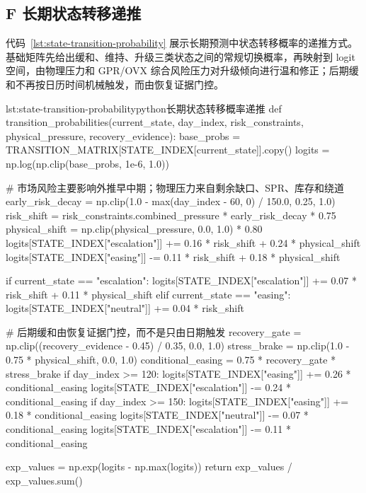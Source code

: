 \subsection*{F 长期状态转移递推}

代码~\ref{lst:state-transition-probability} 展示长期预测中状态转移概率的递推方式。基础矩阵先给出缓和、维持、升级三类状态之间的常规切换概率，再映射到 logit 空间，由物理压力和 GPR/OVX 综合风险压力对升级倾向进行温和修正；后期缓和不再按日历时间机械触发，而由恢复证据门控。

\begin{paperlisting}{lst:state-transition-probability}{python}{长期状态转移概率递推}
def transition_probabilities(current_state, day_index, risk_constraints,
                             physical_pressure, recovery_evidence):
    base_probs = TRANSITION_MATRIX[STATE_INDEX[current_state]].copy()
    logits = np.log(np.clip(base_probs, 1e-6, 1.0))

    # 市场风险主要影响外推早中期；物理压力来自剩余缺口、SPR、库存和绕道
    early_risk_decay = np.clip(1.0 - max(day_index - 60, 0) / 150.0,
                               0.25, 1.0)
    risk_shift = risk_constraints.combined_pressure * early_risk_decay * 0.75
    physical_shift = np.clip(physical_pressure, 0.0, 1.0) * 0.80
    logits[STATE_INDEX["escalation"]] += 0.16 * risk_shift + 0.24 * physical_shift
    logits[STATE_INDEX["easing"]] -= 0.11 * risk_shift + 0.18 * physical_shift

    if current_state == "escalation":
        logits[STATE_INDEX["escalation"]] += 0.07 * risk_shift + 0.11 * physical_shift
    elif current_state == "easing":
        logits[STATE_INDEX["neutral"]] += 0.04 * risk_shift

    # 后期缓和由恢复证据门控，而不是只由日期触发
    recovery_gate = np.clip((recovery_evidence - 0.45) / 0.35, 0.0, 1.0)
    stress_brake = np.clip(1.0 - 0.75 * physical_shift, 0.0, 1.0)
    conditional_easing = 0.75 * recovery_gate * stress_brake
    if day_index >= 120:
        logits[STATE_INDEX["easing"]] += 0.26 * conditional_easing
        logits[STATE_INDEX["escalation"]] -= 0.24 * conditional_easing
    if day_index >= 150:
        logits[STATE_INDEX["easing"]] += 0.18 * conditional_easing
        logits[STATE_INDEX["neutral"]] -= 0.07 * conditional_easing
        logits[STATE_INDEX["escalation"]] -= 0.11 * conditional_easing

    exp_values = np.exp(logits - np.max(logits))
    return exp_values / exp_values.sum()
\end{paperlisting}

